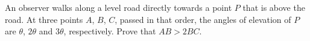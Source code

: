 An observer walks along a level road directly towards a point $P$ that is above the road. At three points $A$, $B$, $C$, passed in that order, the angles of elevation of $P$ are $\theta$, $2\theta$ and $3\theta$, respectively. Prove that $AB>2BC$.
